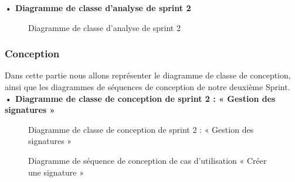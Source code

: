 \textbf{•	Diagramme de classe d'analyse de sprint 2 }

\begin{figure}[H]
  \centering
  \caption{Diagramme de classe d'analyse de sprint 2}
  \label{fig:class_analyse_signatures}
\end{figure}


\subsubsection{Conception}
Dans cette partie nous allons représenter le diagramme de classe de conception, ainsi que les diagrammes de séquences de conception de notre deuxième Sprint. \\

\textbf{•	Diagramme de classe de conception de sprint 2 : « Gestion des signatures »}

\begin{figure}[H]
  \centering
  \caption{Diagramme de classe de conception de sprint 2 : « Gestion des signatures »}
  \label{fig:class_diagram_signatures}
\end{figure}


\begin{figure}[H]
  \centering
  \caption{Diagramme de séquence de conception de cas d'utilisation « Créer une signature  »}
  \label{fig:sequence_conception_create_signature}
\end{figure}


